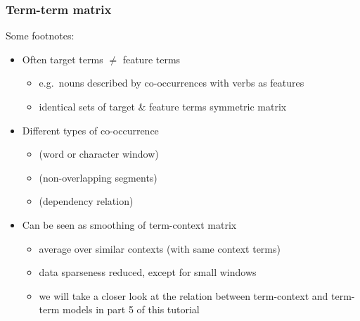 \documentclass[t]{beamer} %
\begin{document}
\begin{frame}
  \frametitle{Term-term matrix}

  Some footnotes:
  \begin{itemize}
  \item Often target terms $\neq$ feature terms
    \begin{itemize}
    \item e.g.\ nouns described by co-occurrences with verbs as features
    \item identical sets of target \& feature terms \so symmetric matrix
    \end{itemize}
  \item Different types of co-occurrence \citep{Evert:08}
    \begin{itemize}
    \item {} (word or character window)
    \item {} (non-overlapping segments)
    \item {} (dependency relation)
    \end{itemize}
  \item Can be seen as smoothing of term-context matrix
    \begin{itemize}
    \item average over similar contexts (with same context terms)
    \item data sparseness reduced, except for small windows
    \item we will take a closer look at the relation between term-context and term-term models in part 5 of this tutorial
    \end{itemize}
  \end{itemize}

\end{frame}

\end{document}
